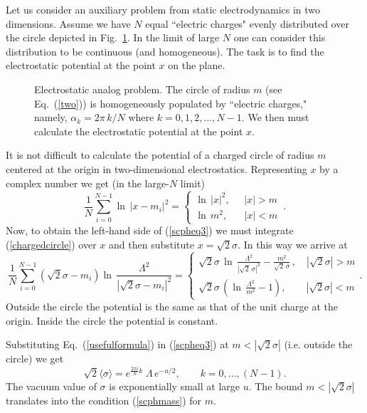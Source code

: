 \documentclass[epsfig,12pt]{article}
\def\beq{\begin{equation}}
\def\eeq{\end{equation}}
\def\beq{\begin{equation}}
\def\eeq{\end{equation}}
\begin{document}
{\vspace{2mm}

Let us consider an auxiliary problem from static electrodynamics in two dimensions.
Assume we have $N$ equal ``electric charges" evenly distributed over the circle
depicted in Fig.~\ref{circ}. In the limit of large $N$ one can consider this distribution to be continuous
(and homogeneous). The task is to find the electrostatic potential at the point $x$ on the plane.

\begin{figure}
\epsfxsize=7cm
\centerline{}
\caption{\small Electrostatic analog problem. The circle of radius $m$ (see Eq.~(\ref{two}))
is homogeneously populated by ``electric charges," namely,
$\alpha_k = 2\pi \, k/N$ where $k= 0,1,2, ..., N-1$.
We then must calculate the electrostatic potential at the
point $x$.}
\label{circ}
\end{figure}
It is not difficult to calculate  the potential of a charged circle
of radius $m$  centered at the origin  in  two-dimensional electrostatics.
Representing $x$ by a complex  number we get (in the large-$N$ limit) 
\beq
\frac{1}{N}\sum_{i=0}^{N-1}\ln\, {|x-m_i|^2}
=\left\{
\begin{array}{cc}
\ln\,{|x|^2},\;\;\;\;\; |x|>m\\[2mm]
\ln\,{m^2},\;\;\;\;\;\; |x|<m
\end{array}\,.
\right.
\label{chargedcircle}
\eeq
Now, to obtain the left-hand side of (\ref{scpheq3}) we must integrate (\ref{chargedcircle})
over $x$ and then substitute $x=\sqrt{2}\sigma$. In this way we arrive at
\beq
 \frac{1}{N}\sum_{i=0}^{N-1}\left(\sqrt{2}\sigma-m_i\right)\ln\, {\frac{\Lambda^2}{|\sqrt{2}\sigma-m_i|^2}}
=\left\{
\begin{array}{cc}
\sqrt{2}\sigma\,\ln\, {\frac{\Lambda^2}{|\sqrt{2}\,\sigma|^2}}-\frac{m^2}{\sqrt{2}\,\bar\sigma}\,,\quad |\sqrt{2}\sigma|>m\\[3mm]
\sqrt{2}\sigma\,\left(\ln\, {\frac{\Lambda^2}{m^2}}-1\right),\qquad |\sqrt{2}\sigma|<m
\end{array}
\right. .
\label{usefulformula}
\eeq
Outside the circle the potential is the same as that of the unit charge at the origin.
Inside the circle the potential is constant.


Substituting Eq.~(\ref{usefulformula}) in (\ref{scpheq3}) at  $m<|\sqrt{2}\sigma|$ 
(i.e. outside the circle) we get
\beq
\sqrt{2}\langle \sigma\rangle=e^{\frac{2\pi i}{N}k}\;\Lambda\,e^{-u/2},\qquad k=0,...,(N-1).
\label{scphsigma}
\eeq
The vacuum value of $\sigma$ is exponentially small at large $u$. The bound $m<|\sqrt{2}\sigma|$
translates into the condition (\ref{scphmass}) for  $m$. 

}
\end{document}
